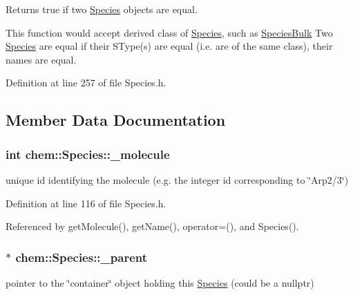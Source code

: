Returns true if two \hyperlink{classchem_1_1Species}{Species} objects are equal. 

This function would accept derived class of \hyperlink{classchem_1_1Species}{Species}, such as \hyperlink{classchem_1_1SpeciesBulk}{Species\-Bulk} Two \hyperlink{classchem_1_1Species}{Species} are equal if their S\-Type(s) are equal (i.\-e. are of the same class), their names are equal. 

Definition at line 257 of file Species.\-h.



\subsection{Member Data Documentation}
\hypertarget{classchem_1_1Species_afc69264ab4c24ac17b7d1946b1b380f4}{
\subsubsection[{\-\_\-molecule}]{\setlength{\rightskip}{0pt plus 5cm}int {\bf chem\-::\-Species\-::\-\_\-molecule}}}\label{classchem_1_1Species_afc69264ab4c24ac17b7d1946b1b380f4}


unique id identifying the molecule (e.\-g. the integer id corresponding to \char`\"{}\-Arp2/3\char`\"{}) 



Definition at line 116 of file Species.\-h.



Referenced by get\-Molecule(), get\-Name(), operator=(), and Species().

\hypertarget{classchem_1_1Species_ae0743ec422b63dcb29b4cbfee484902d}{
\subsubsection[{\-\_\-parent}]{$\ast$ {\bf chem\-::\-Species\-::\-\_\-parent}}}\label{classchem_1_1Species_ae0743ec422b63dcb29b4cbfee484902d}


pointer to the \char`\"{}container\char`\"{} object holding this \hyperlink{classchem_1_1Species}{Species} (could be a nullptr) 



